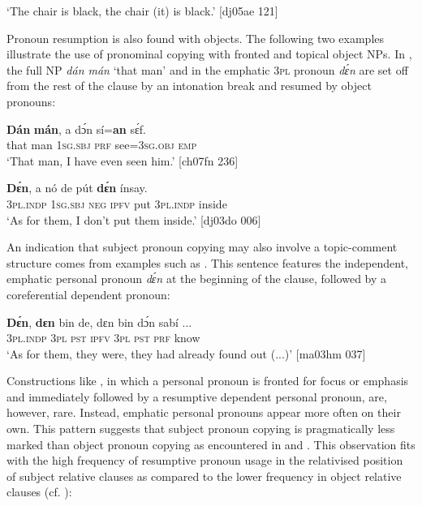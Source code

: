 \glt ‘The chair is black, the chair (it) is black.’ [dj05ae 121]
\z

Pronoun resumption is also found with objects{\fff}. The following two examples illustrate the use of pronominal copying with fronted and topical object NPs. In , the full NP \textit{dán mán} ‘that man’ and in  the emphatic \textsc{3pl} pronoun \textit{dɛ́n} are set off from the rest of the clause by an intonation break and resumed by object pronouns: 


\ea%
    \label{ex:key:516}
    \gll \textbf{Dán}    \textbf{mán},  a    dɔ́n  sí=\textbf{an}    sɛ́f.\\
that    man    \textsc{1sg.sbj}  \textsc{prf}  see=\textsc{3sg.obj}  \textsc{emp}\\

\glt ‘That man, I have even seen him.’ [ch07fn 236]
\z


\ea%
    \label{ex:key:517}
    \gll \textbf{Dɛ́n},    a    nó  de  pút  \textbf{dɛ́n}    ínsay.\\
\textsc{3pl.indp}  \textsc{1sg.sbj}  \textsc{neg}  \textsc{ipfv}  put  \textsc{3pl.indp}  inside\\

\glt ‘As for them, I don’t put them inside.’ [dj03do 006]
\z

An indication that subject pronoun copying may also involve a topic-comment structure comes from examples such as . This sentence features the independent, emphatic personal pronoun \textit{dɛ́n} at the beginning of the clause, followed by a coreferential dependent pronoun:


\ea%
    \label{ex:key:518}
    \gll \textbf{Dɛ́n},    \textbf{dɛn}  bin  de,  dɛn  bin  dɔ́n  sabí    \op...\cp{}\\
\textsc{3pl.indp}  \textsc{3pl}  \textsc{pst}  \textsc{ipfv}  \textsc{3pl}  \textsc{pst}  \textsc{prf}  know\\

\glt ‘As for them, they were, they had already found out (...)’ [ma03hm 037]
\z

Constructions like , in which a personal pronoun is fronted for focus or emphasis and immediately followed by a resumptive dependent personal pronoun, are, however, rare. Instead, emphatic personal pronouns appear more often on their own. This pattern suggests that subject pronoun copying is pragmatically less marked than object pronoun copying as encountered in  and . This observation fits with the high frequency of resumptive pronoun usage in the relativised position of subject relative clauses as compared to the lower frequency in object relative clauses (cf. ):


